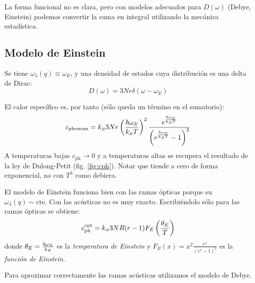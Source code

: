 La forma funcional no es clara, pero con modelos adecuados para
$D(\omega)$ (Debye, Einstein) podemos convertir la suma en integral
utilizando la mecánica estadística.

\subsection{Modelo de Einstein}
Se tiene $\omega_\lambda(q) \equiv \omega_E$, y una densidad de
estados cuya distribución es una delta de Dirac:
\begin{equation}
  D(\omega) = 3Nr\delta(\omega-\omega_E)
\end{equation}

El calor específico es, por tanto (sólo queda un término en el sumatorio):
\begin{equation}
  c_{\text{phonons}} =  k_{\scriptscriptstyle{B}}  3Nr\left( \frac{\hbar \omega_E}{k_{\scriptscriptstyle{B}}  T}
  \right)^2 \frac{e^{ \frac{\hbar \omega_E}{k_{\scriptscriptstyle{B}}  T} }}{\left(e^{
        \frac{\hbar \omega_E}{k_{\scriptscriptstyle{B}}  T} }-1 \right)^2}
\end{equation}
A temperaturas bajas $c_\text{ph} \to 0$ y a temperaturas altas se
recupera el resultado de la ley de Dulong-Petit
(fig. \ref{fig:cph}). Notar que tiende a cero de forma exponencial, no
con $T^3$ como debiera.

El modelo de Einstein funciona bien con las ramas ópticas porque su
$\omega_\lambda(q) \sim \text{cte.}$ Con las acústicas no es
muy exacto. Escribiéndolo sólo para las ramas ópticas se obtiene:
\begin{equation}
  c_\text{ph}^\text{opt} = k_{\scriptscriptstyle{B}}  3NR (r-1) F_E \left( \frac{\theta_E}{T} \right)
\end{equation}
donde $\theta_E =\frac{\hbar \omega_E}{k_{\scriptscriptstyle{B}} }$ es la \emph{temperatura
  de Einstein} y $F_E (x) = x^2 \frac{e^{x}}{(e^{x}-1)^2} $ es la
\emph{función de Einstein}.

Para aproximar correctamente las ramas acústicas utilizamos el modelo
de Debye.

